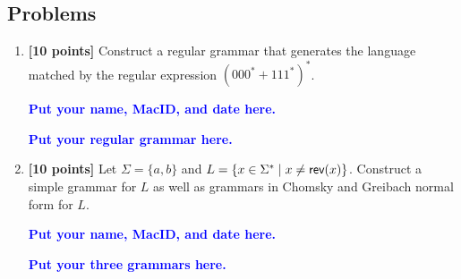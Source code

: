 \documentclass[11pt,fleqn]{article}
\newcommand{\be}{\begin{enumerate}}
\newcommand{\ee}{\end{enumerate}}
\newcommand{\mname}[1]{\mbox{\sf #1}}
\newcommand{\set}[1]{{\{ #1 \}}}
\begin{document}
\newpage

\subsection*{Problems}

\be

  \item \textbf{[10 points]} Construct a regular grammar that
    generates the language matched by the regular expression $(000^* +
    111^*)^*$.

  \bigskip

  \textcolor{blue}{\textbf{Put your name, MacID, and date here.}}

  \textcolor{blue}{\textbf{Put your regular grammar here.}}

  \item \textbf{[10 points]} Let $\Sigma = \set{a,b}$ and $L = \set{x
    \in \Sigma^* \mid x \not= \mname{rev}(x)}$.  Construct a simple
    grammar for $L$ as well as grammars in Chomsky and Greibach normal
    form for $L$.

  \bigskip

  \textcolor{blue}{\textbf{Put your name, MacID, and date here.}}

  \textcolor{blue}{\textbf{Put your three grammars here.}}

\ee
\end{document}
